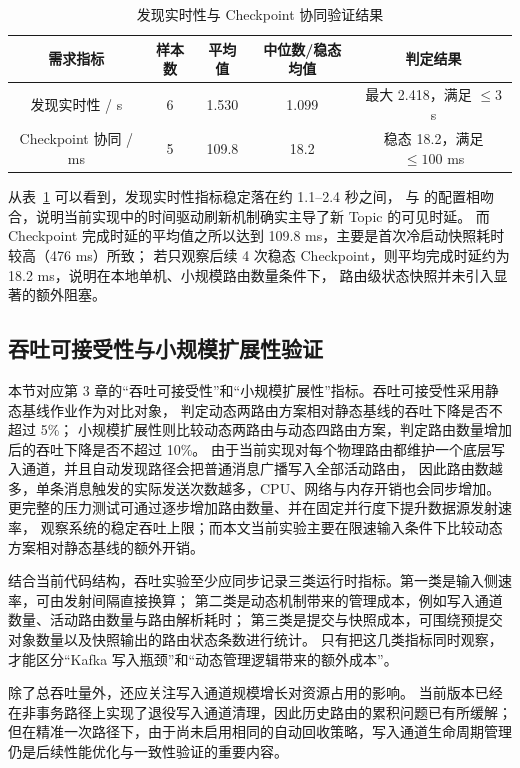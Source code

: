 \begin{table}[htbp]
  \centering
  \caption{发现实时性与 Checkpoint 协同验证结果}
  \label{tab:latency-results}
  \begin{tabular}{ccccc}
    \toprule
    需求指标 & 样本数 & 平均值 & 中位数/稳态均值 & 判定结果 \\
    \midrule
    发现实时性 / s & 6 & 1.530 & 1.099 & 最大 2.418，满足 $\leq 3$ s \\
    Checkpoint 协同 / ms & 5 & 109.8 & 18.2 & 稳态 18.2，满足 $\leq 100$ ms \\
    \bottomrule
  \end{tabular}
\end{table}

从表~\ref{tab:latency-results} 可以看到，发现实时性指标稳定落在约 1.1--2.4 秒之间，
与  的配置相吻合，说明当前实现中的时间驱动刷新机制确实主导了新 Topic 的可见时延。
而 Checkpoint 完成时延的平均值之所以达到 109.8 ms，主要是首次冷启动快照耗时较高（476 ms）所致；
若只观察后续 4 次稳态 Checkpoint，则平均完成时延约为 18.2 ms，说明在本地单机、小规模路由数量条件下，
路由级状态快照并未引入显著的额外阻塞。

\subsection{吞吐可接受性与小规模扩展性验证}

本节对应第 3 章的“吞吐可接受性”和“小规模扩展性”指标。吞吐可接受性采用静态基线作业作为对比对象，
判定动态两路由方案相对静态基线的吞吐下降是否不超过 5\%；
小规模扩展性则比较动态两路由与动态四路由方案，判定路由数量增加后的吞吐下降是否不超过 10\%。
由于当前实现对每个物理路由都维护一个底层写入通道，并且自动发现路径会把普通消息广播写入全部活动路由，
因此路由数越多，单条消息触发的实际发送次数越多，CPU、网络与内存开销也会同步增加。
更完整的压力测试可通过逐步增加路由数量、并在固定并行度下提升数据源发射速率，
观察系统的稳定吞吐上限；而本文当前实验主要在限速输入条件下比较动态方案相对静态基线的额外开销。

结合当前代码结构，吞吐实验至少应同步记录三类运行时指标。第一类是输入侧速率，可由发射间隔直接换算；
第二类是动态机制带来的管理成本，例如写入通道数量、活动路由数量与路由解析耗时；
第三类是提交与快照成本，可围绕预提交对象数量以及快照输出的路由状态条数进行统计。
只有把这几类指标同时观察，才能区分“Kafka 写入瓶颈”和“动态管理逻辑带来的额外成本”。

除了总吞吐量外，还应关注写入通道规模增长对资源占用的影响。
当前版本已经在非事务路径上实现了退役写入通道清理，因此历史路由的累积问题已有所缓解；
但在精准一次路径下，由于尚未启用相同的自动回收策略，写入通道生命周期管理仍是后续性能优化与一致性验证的重要内容。


